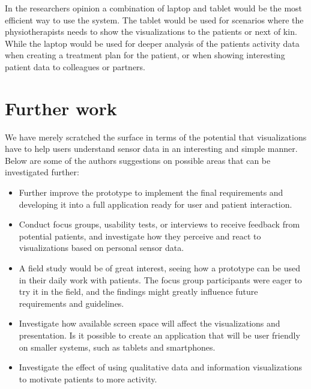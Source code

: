 In the researchers opinion a combination of laptop and tablet would be the most efficient way to use the system. The tablet would be used for scenarios where the physiotherapists needs to show the visualizations to the patients or next of kin. While the laptop would be used for deeper analysis of the patients activity data when creating a treatment plan for the patient, or when showing interesting patient data to colleagues or partners.

\section{Further work}
We have merely scratched the surface in terms of the potential that visualizations have to help users understand sensor data in an interesting and simple manner. Below are some of the authors suggestions on possible areas that can be investigated further:

\begin{itemize}
  \item Further improve the  prototype to implement the final requirements and developing it into a full application ready for user and patient interaction.
  \item Conduct focus groups, usability tests, or interviews to receive feedback from potential patients, and investigate how they perceive and react to visualizations based on personal sensor data.
  \item A field study would be of great interest, seeing how a prototype can be used in their daily work with patients. The focus group participants were eager to try it in the field, and the findings might greatly influence future requirements and guidelines.
  \item Investigate how available screen space will affect the visualizations and presentation. Is it possible to create an application that will be user friendly on smaller systems, such as tablets and smartphones.
  \item Investigate the effect of using qualitative data and information visualizations to motivate patients to more activity.
\end{itemize}


